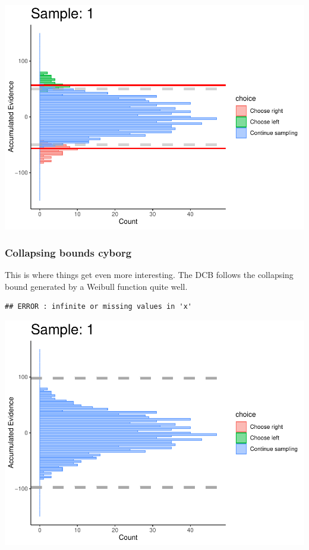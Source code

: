 \documentclass[
]{book}
\begin{document}
\begin{center}\includegraphics[width=0.8\linewidth]{LateNightBayes_files/figure-latex/fixed_dcb-100} \end{center}

\hypertarget{collapsing-bounds-cyborg-2}{%
\subsubsection*{Collapsing bounds cyborg}\label{collapsing-bounds-cyborg-2}}

This is where things get even more interesting. The DCB follows the collapsing bound generated by a Weibull function quite well.

\begin{verbatim}
## ERROR : infinite or missing values in 'x'
\end{verbatim}

\begin{center}\includegraphics[width=0.8\linewidth]{LateNightBayes_files/figure-latex/collapsing_dcb-1} \end{center}
\end{document}
